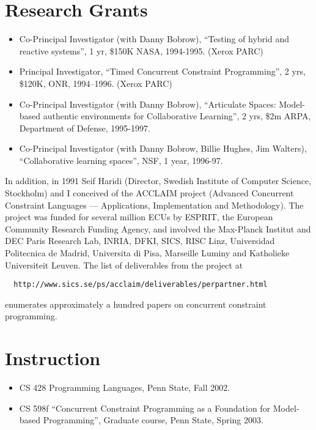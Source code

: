 \documentclass{article}
\begin{document}
\section*{Research Grants}
\begin{itemize}
\item   Co-Principal Investigator (with Danny Bobrow), ``Testing of hybrid
   and reactive systems'', 1 yr, \$150K NASA, 1994-1995. (Xerox PARC)

\item   Principal Investigator, ``Timed Concurrent Constraint
   Programming'', 2 yrs, \$120K, ONR, 1994--1996.  (Xerox PARC)

\item   Co-Principal Investigator (with Danny Bobrow), ``Articulate Spaces:
   Model-based authentic environments for Collaborative Learning'', 2
   yrs, \$2m ARPA, Department of Defense, 1995-1997.

\item   Co-Principal Investigator (with Danny Bobrow, Billie Hughes, Jim
   Walters), ``Collaborative learning spaces'', NSF, 1 year, 1996-97.
\end{itemize}

In addition, in 1991 Seif Haridi (Director, Swedish Institute of
Computer Science, Stockholm) and I conceived of the {\sc ACCLAIM} project
(Advanced Concurrent Constraint Languages --- Applications,
Implementation and Methodology). The project was funded for several
million ECUs by ESPRIT, the European Community Research Funding
Agency, and involved the Max-Planck Institut and DEC Paris Research
Lab, INRIA, DFKI, SICS, RISC Linz, Universidad Politecnica de Madrid,
Universita di Pisa, Marseille Luminy and Katholieke Universiteit
Leuven. The list of deliverables from the project at
\begin{verbatim}
  http://www.sics.se/ps/acclaim/deliverables/perpartner.html
\end{verbatim}
enumerates approximately a hundred papers on concurrent constraint
programming.

\section*{Instruction}
\begin{itemize}
  \item CS 428 Programming Languages, Penn State, Fall 2002.
  \item CS 598f ``Concurrent Constraint Programming as a Foundation
  for Model-based Programming'', Graduate course, Penn State, Spring
  2003.
\end{itemize}
\end{document}
